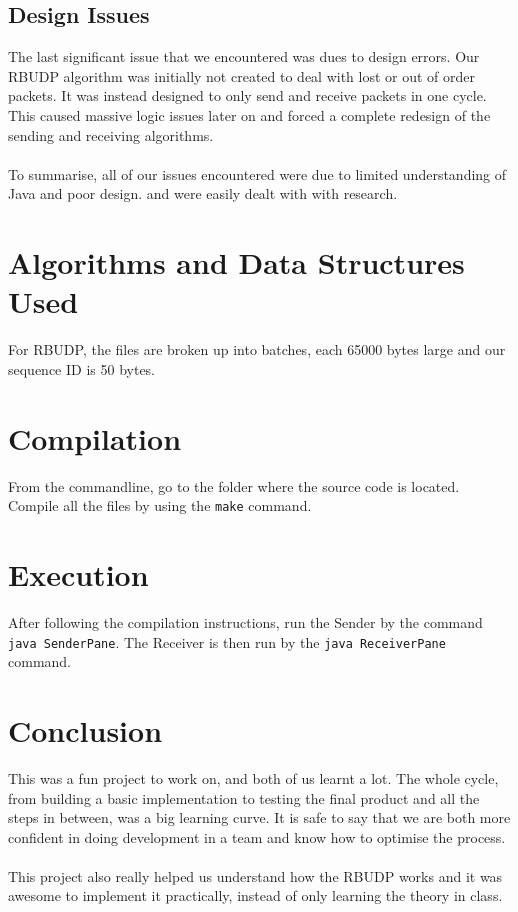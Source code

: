 \documentclass[13pt]{article}
\begin{document}
\subsection{Design Issues}

The last significant issue that we encountered was dues to design errors. Our
RBUDP algorithm was initially not created to deal with lost or out of order
packets. It was instead designed to only send and receive packets in one cycle.
This caused massive logic issues later on and forced a complete redesign of the
sending and receiving algorithms.
\\\\
To summarise, all of our issues encountered were due to limited understanding
of Java and poor design. and were easily dealt with with research.

\section{Algorithms and Data Structures Used}

For RBUDP, the files are broken up into batches, each 65000 bytes large and our 
sequence ID is 50 bytes.

\section{Compilation}

From the commandline, go to the folder where the source code is located. Compile
all the files by using the \texttt{make} command.

\section{Execution}

After following the compilation instructions, run the Sender by the command \texttt{java SenderPane}. The
Receiver is then run by the \texttt{java ReceiverPane} command.

\section{Conclusion}

This was a fun project to work on, and both of us learnt a lot. The whole cycle, from
building a basic implementation to testing the final product and all the steps in between,
was a big learning curve. It is safe to say that we are both more confident in doing
development in a team and know how to optimise the process.
\\\\
This project also really helped us understand how the RBUDP works and it was awesome
to implement it practically, instead of only learning the theory in class.
\end{document}
